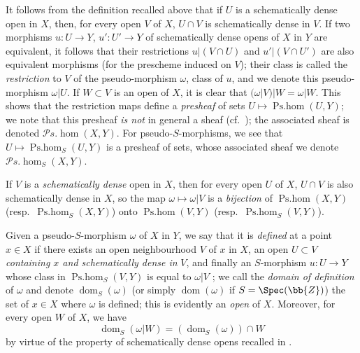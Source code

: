 \begin{env}[20.2.2]
\label{IV.20.2.2}
It follows from the definition recalled above that if $U$ is a schematically dense open in $X$, then, for every open $V$ of $X$, $U\cap V$ is schematically dense in $V$.
If two morphisms $u:U\to Y$, $u':U'\to Y$ of schematically dense opens of $X$ in $Y$ are equivalent, it follows that their restrictions $u|(V\cap U)$ and $u'|(V\cap U')$ are also equivalent morphisms (for the prescheme induced on $V$);
their class is called the \emph{restriction} to $V$ of the pseudo-morphism $\omega$, class of $u$, and we denote this pseudo-morphism $\omega|U$.
If $W\subset V$ is an open of $X$, it is clear that $(\omega|V)|W=\omega|W$.
This shows that the restriction maps define a \emph{presheaf} of sets $U\mapsto\operatorname{Ps.hom}(U,Y)$;
we note that this presheaf \emph{is not} in general a sheaf (cf.\ );
the associated sheaf is denoted $\mathscr{P}\!s.\!\operatorname{hom}(X,Y)$.
For pseudo-$S$-morphisms, we see that $U\mapsto\operatorname{Ps.hom}_S(U,Y)$ is a presheaf of sets, whose associated sheaf we denote $\mathscr{P}\!s.\!\operatorname{hom}_S(X,Y)$.

If $V$ is a \emph{schematically dense} open in $X$, then for every open $U$ of $X$, $U\cap V$ is also schematically dense in $X$, so the map $\omega\mapsto\omega|V$ is a \emph{bijection} of $\operatorname{Ps.hom}(X,Y)$ (resp.\ $\operatorname{Ps.hom}_S(X,Y)$) onto $\operatorname{Ps.hom}(V,Y)$ (resp.\ $\operatorname{Ps.hom}_S(V,Y)$).
\end{env}

\begin{env}[20.2.3]
\label{IV.20.2.3}
Given a pseudo-$S$-morphism $\omega$ of $X$ in $Y$, we say that it is \emph{defined} at a point $x\in X$ if there exists an open neighbourhood $V$ of $x$ in $X$, an open $U\subset V$ \emph{containing $x$ and schematically dense in} $V$, and finally an $S$-morphism $u:U\to Y$ whose class in $\operatorname{Ps.hom}_S(V,Y)$ is equal to $\omega|V$ ;
we call the \emph{domain of definition} of $\omega$ and denote $\operatorname{dom}_S(\omega)$ (or simply $\operatorname{dom}(\omega)$ if $S=\Spec(\bb{Z})$) the set of $x\in X$ where $\omega$ is defined;
this is evidently an \emph{open} of $X$.
Moreover, for every open $W$ of $X$, we have
\[
\label{IV.20.2.3.1}
  \operatorname{dom}_S(\omega|W)=(\operatorname{dom}_S(\omega))\cap W
  \tag{20.2.3.1}
\]
by virtue of the property of schematically dense opens recalled in .
\end{env}

